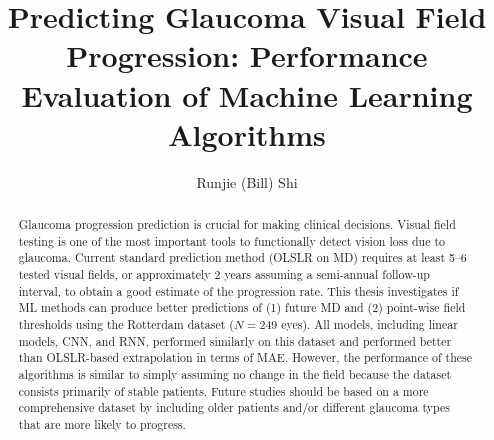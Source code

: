 \documentclass[onehalfspaced, 12pt, normalmargins]{ut-thesis}
\author{Runjie (Bill) Shi}
\title{Predicting Glaucoma Visual Field Progression: Performance Evaluation of Machine Learning Algorithms}
\begin{document}
	
\newcommand{\vf}{\textrm{VF}}
\newcommand{\md}{\textrm{MD}}
\newcommand{\iop}{\textrm{IOP}}

\begin{preliminary}

\makecover
\addtocounter{page}{-1}
\maketitle
\addtocounter{page}{-1}


\begin{abstract}
Glaucoma progression prediction is crucial for making clinical decisions. Visual field testing is one of the most important tools to functionally detect vision loss due to glaucoma. Current standard prediction method (\ac{OLSLR} on \ac{MD}) requires at least 5--6 tested visual fields, or approximately 2 years assuming a semi-annual follow-up interval, to obtain a good estimate of the progression rate. This thesis investigates if \acl{ML} methods can produce better predictions of (1) future \ac{MD} and (2) point-wise field thresholds using the Rotterdam dataset ($N=249$ eyes). All models, including linear models, \ac{CNN}, and \ac{RNN}, performed similarly on this dataset and performed better than \ac{OLSLR}-based extrapolation in terms of \ac{MAE}. However, the performance of these algorithms is similar to simply assuming no change in the field because the dataset consists primarily of stable patients. Future studies should be based on a more comprehensive dataset by including older patients and/or different glaucoma types that are more likely to progress. 

\end{abstract}



\end{preliminary}
\end{document}
